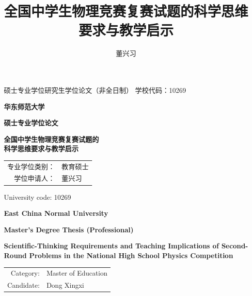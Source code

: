 \documentclass[
  12pt,
  a4paper,twoside,openany]{ctexbook}
\title{全国中学生物理竞赛复赛试题的科学思维要求与教学启示}
\author{董兴习}
\date{}
\renewcommand{\arraystretch}{1.22}
\begin{document}
\frontmatter
\begin{titlepage}
\thispagestyle{empty}
\begin{flushleft}
 硕士专业学位研究生学位论文（非全日制）
\hfill 学校代码：10269
\end{flushleft}
\vspace*{2.2cm}
\begin{center}
{\heiti{}\bfseries 华东师范大学\par}
\vspace{0.7cm}
{\heiti{}\bfseries 硕士专业学位论文\par}
\vspace{2.8cm}
{\songti{}\bfseries 全国中学生物理竞赛复赛试题的\\[0.45em]科学思维要求与教学启示\par}
\vfill
\renewcommand{\arraystretch}{1.55}
\begin{tabular}{r l}
专业学位类别： & 教育硕士 \\
学位申请人： & 董兴习 \\
\end{tabular}
\vfill
{ \par}
\end{center}
\clearpage
\thispagestyle{empty}
\begin{flushright}
 University code: 10269
\end{flushright}
\vspace*{2.3cm}
\begin{center}
{\bfseries\fontsize{21pt}{28pt}\selectfont East China Normal University\par}
\vspace{0.7cm}
{\bfseries\fontsize{18pt}{24pt}\selectfont Master's Degree Thesis (Professional)\par}
\vspace{2.7cm}
{\bfseries\fontsize{16pt}{23pt}\selectfont Scientific-Thinking Requirements and Teaching Implications of Second-Round Problems in the National High School Physics Competition\par}
\vfill
\renewcommand{\arraystretch}{1.55}
\begin{tabular}{r l}
Category: & Master of Education \\
Candidate: & Dong Xingxi \\
\end{tabular}
\vfill
{\fontsize{12pt}{16pt}\selectfont \par}
\end{center}
\end{titlepage}
\end{document}
